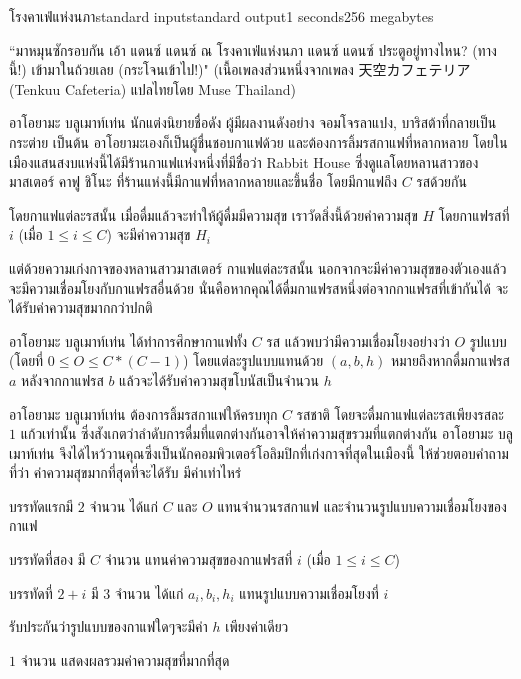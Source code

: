 \documentclass[11pt,a4paper]{article}
\begin{document}
\begin{problem}{โรงคาเฟ่แห่งนภา}{standard input}{standard output}{1 seconds}{256 megabytes}

``มาหมุนซักรอบกัน เอ้า แดนซ์ แดนซ์
ณ โรงคาเฟ่แห่งนภา แดนซ์ แดนซ์
ประตูอยู่ทางไหน? (ทางนี้!)
เข้ามาในถ้วยเลย (กระโจนเข้าไป!)"
(เนื้อเพลงส่วนหนึ่งจากเพลง 天空カフェテリア (Tenkuu Cafeteria) แปลไทยโดย Muse Thailand)

อาโอยามะ บลูเมาท์เท่น นักแต่งนิยายชื่อดัง ผู้มีผลงานดังอย่าง จอมโจรลาแปง, บาริสต้าที่กลายเป็นกระต่าย เป็นต้น อาโอยามะเองก็เป็นผู้ชื่นชอบกาแฟด้วย และต้องการลิ้มรสกาแฟที่หลากหลาย โดยในเมืองแสนสงบแห่งนี้ได้มีร้านกาแฟแห่งหนึ่งที่มีชื่อว่า Rabbit House ซึ่งดูแลโดยหลานสาวของมาสเตอร์ คาฟู ชิโนะ ที่ร้านแห่งนี้มีกาแฟที่หลากหลายและขึ้นชื่อ โดยมีกาแฟถึง $C$ รสด้วยกัน

โดยกาแฟแต่ละรสนั้น เมื่อดื่มแล้วจะทำให้ผู้ดื่มมีความสุข เราวัดสิ่งนี้ด้วยค่าความสุข $H$ โดยกาแฟรสที่ $i$ (เมื่อ $1 \le i \le C$) จะมีค่าความสุข $H_i$

แต่ด้วยความเก่งกาจของหลานสาวมาสเตอร์ กาแฟแต่ละรสนั้น นอกจากจะมีค่าความสุขของตัวเองแล้ว จะมีความเชื่อมโยงกับกาแฟรสอื่นด้วย นั่นคือหากคุณได้ดื่มกาแฟรสหนึ่งต่อจากกาแฟรสที่เข้ากันได้ จะได้รับค่าความสุขมากกว่าปกติ

อาโอยามะ บลูเมาท์เท่น ได้ทำการศึกษากาแฟทั้ง $C$ รส แล้วพบว่ามีความเชื่อมโยงอย่างว่า $O$ รูปแบบ (โดยที่ $0 \le O \le C*(C-1) $) โดยแต่ละรูปแบบแทนด้วย $(a,b,h)$ หมายถึงหากดื่มกาแฟรส $a$ หลังจากกาแฟรส $b$ แล้วจะได้รับค่าความสุขโบนัสเป็นจำนวน $h$

อาโอยามะ บลูเมาท์เท่น ต้องการลิ้มรสกาแฟให้ครบทุก $C$ รสชาติ โดยจะดื่มกาแฟแต่ละรสเพียงรสละ $1$ แก้วเท่านั้น ซึ่งสังเกตว่าลำดับการดื่มที่แตกต่างกันอาจให้ค่าความสุขรวมที่แตกต่างกัน อาโอยามะ บลูเมาท์เท่น จึงได้ไหว้วานคุณซึ่งเป็นนักคอมพิวเตอร์โอลิมปิกที่เก่งกาจที่สุดในเมืองนี้ ให้ช่วยตอบคำถามที่ว่า ค่าความสุขมากที่สุดที่จะได้รับ มีค่าเท่าไหร่

\InputFile

บรรทัดแรกมี $2$ จำนวน ได้แก่ $C$ และ $O$ แทนจำนวนรสกาแฟ และจำนวนรูปแบบความเชื่อมโยงของกาแฟ

บรรทัดที่สอง มี $C$ จำนวน แทนค่าความสุขของกาแฟรสที่ $i$ (เมื่อ $1 \le i \le C$)

บรรทัดที่ $2 + i$ มี $3$ จำนวน ได้แก่ $a_i, b_i, h_i$ แทนรูปแบบความเชื่อมโยงที่ $i$

รับประกันว่ารูปแบบของกาแฟใดๆจะมีค่า $h$ เพียงค่าเดียว

\OutputFile

$1$ จำนวน แสดงผลรวมค่าความสุขที่มากที่สุด

\end{problem}
\end{document}
